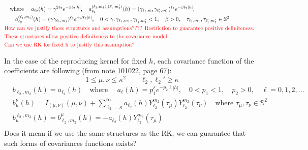 \documentclass[11pt]{article}
\begin{document}
\begin{itemize}
\begin{align*}
\\
&\quad \text{where } \quad a_{\ell_2}(h) = \gamma^{2 \ell_2} e^{-\beta \ell_2|h|}, \quad  a_{\ell_2}^{(\ell_1,m_1), (\ell_1',m_1')}(h) = (\gamma_{\ell_1,m_1} \gamma_{\ell_1',m_1'})^{\ell_2} e^{-\beta \ell_2|h|},\\
&\quad \quad a_{\ell_2}^{(\ell_1, m_1)}(h) = (\gamma \gamma_{\ell_1,m_1})^{\ell_2} e^{-\beta \ell_2|h|}, \quad 0<\gamma, \gamma_{\ell_1,m_1}, \gamma_{\ell_1',m_1'} < 1, \quad \beta >0, \quad \tau_{\ell_1,m_1},  \tau_{\ell_1',m_1'} \in \mathbb{S}^2 \\
&\text{\color{red} How can we justify these structures and assumptions???? Restriction to guarantee positive definiteness.}\\
&\text{\color{red} These structures allow positive definiteness to the covariance model.}\\
&\text{\color{red} Can we use RK for fixed h to justify this assumption?}\\
\end{align*}

{\color{red}
In the case of the reproducing kernel for fixed $h$, each covariance function of the coefficients are following (from note 101022, page 67): \\
$$1 \le \mu, \nu \le \kappa^2 \quad \quad \ell_2, {\ell_2}'  \ge \kappa$$ 
\begin{align*}
&b_{\ell_2,m_2}(h) = a_{\ell_2}(h) \quad \text{where } \quad a_\ell(h)=p_1^\ell e^{-p_2 \ell |h|}, \quad 0<p_1<1, \quad p_2>0, \quad \ell=0,1,2,\dots\\
&b_{\mu}^{\nu}(h) = I_{(\mu, \nu)}(\mu, \nu) + \sum_{\ell_2=\kappa}^{\infty} a_{\ell_2}(h) Y_{\ell_2}^{m_2}(\tau_\mu) Y_{\ell_2}^{m_2}(\tau_\nu)  \quad \text{where } \tau_\mu, \tau_\nu \in \mathbb{S}^2 \\
&b_{\mu}^{\ell_2,m_2}(h) = b_{\ell_2,m_2}^{\mu}(h) = -a_{\ell_2}(h) Y_{\ell_2}^{m_2}(\tau_\mu)\\
\end{align*}
Does it mean if we use the same structures as the RK, we can guarantee that such forms of covariances functions exists?\\
}

\pagebreak



\end{itemize}
\end{document}
